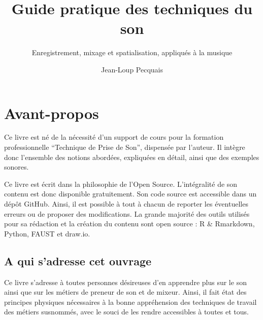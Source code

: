 \documentclass[
  letterpaper,
  DIV=11,
  numbers=noendperiod]{scrreprt}
\title{Guide pratique des techniques du son}
\subtitle{Enregistrement, mixage et spatialisation, appliqués à la
musique}
\author{Jean-Loup Pecquais}
\date{}
\renewcommand*\contentsname{Table des matières}
\newcommand\contentsname{Table des matières}
\begin{document}
\maketitle
\ifdefined\Shaded\renewenvironment{Shaded}{\begin{tcolorbox}[frame hidden, sharp corners, interior hidden, borderline west={3pt}{0pt}{shadecolor}, breakable, enhanced, boxrule=0pt]}{\end{tcolorbox}}\fi

\renewcommand*\contentsname{Table des matières}
{
\hypersetup{linkcolor=}
\setcounter{tocdepth}{2}
\tableofcontents
}

\hypertarget{avant-propos}{%
\chapter*{Avant-propos}\label{avant-propos}}


Ce livre est né de la nécessité d'un support de cours pour la formation
professionnelle ``Technique de Prise de Son'', dispensée par l'auteur.
Il intègre donc l'ensemble des notions abordées, expliquées en détail,
ainsi que des exemples sonores.

Ce livre est écrit dans la philosophie de l'Open Source. L'intégralité
de son contenu est donc disponible gratuitement. Son code source est
accessible dans un dépôt GitHub. Ainsi, il est possible à tout à chacun
de reporter les éventuelles erreurs ou de proposer des modifications. La
grande majorité des outils utilisés pour sa rédaction et la création du
contenu sont open source : R \& Rmarkdown, Python, FAUST et draw.io.

\hypertarget{a-qui-sadresse-cet-ouvrage}{%
\section*{A qui s'adresse cet
ouvrage}\label{a-qui-sadresse-cet-ouvrage}}


Ce livre s'adresse à toutes personnes désireuses d'en apprendre plus sur
le son ainsi que sur les métiers de preneur de son et de mixeur. Ainsi,
il fait état des principes physiques nécessaires à la bonne appréhension
des techniques de travail des métiers susnommés, avec le souci de les
rendre accessibles à toutes et tous.
\end{document}
